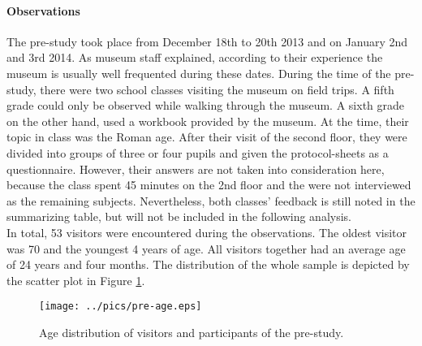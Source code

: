 \paragraph{Observations} The pre-study took place from December 18th to 20th 2013 and on January 2nd and 3rd 2014. As museum staff explained, according to their experience the museum is usually well frequented during these dates. During the time of the pre-study, there were two school classes visiting the museum on field trips. A fifth grade could only be observed while walking through the museum. A sixth grade on the other hand, used a workbook provided by the museum. At the time, their topic in class was the Roman age. After their visit of the second floor, they were divided into groups of three or four pupils and given the protocol-sheets as a questionnaire. However, their answers are not taken into consideration here, because the class spent 45 minutes on the 2nd floor and the were not interviewed as the remaining subjects. Nevertheless, both classes' feedback is still noted in the summarizing table, but will not be included in the following analysis.
\\
In total, 53 visitors were encountered during the observations. The oldest visitor was 70 and the youngest 4 years of age. All visitors together had an average age of 24 years and four months. The distribution of the whole sample is depicted by the scatter plot in Figure \ref{fig:pre-study_ages}. 
\begin{figure}[H]%
\texttt{[image: ../pics/pre-age.eps]}%
\caption{Age distribution of visitors and participants of the pre-study.}
\label{fig:pre-study_ages} %
\end{figure}

